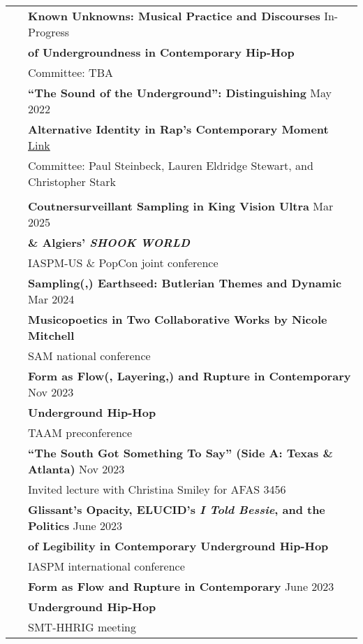 \documentclass[letterpaper, 11pt]{article}
\begin{document}
\begin{longtable}{p{1.3in}p{4.8in}}
\newpage
\nohyphens{\color{OliveGreen}{Writing Projects}} 
& \textbf{Known Unknowns: Musical Practice and Discourses} \hfill{In-Progress} \\
& \textbf{of Undergroundness in Contemporary Hip-Hop} \\
& Committee: TBA \\
& \textbf{``The Sound of the Underground'': Distinguishing} \hfill{May 2022} \\
& \textbf{Alternative Identity in Rap's Contemporary Moment} \hfill \href{https://doi.org/10.7936/cftv-at63}{Link} \\
& Committee: Paul Steinbeck, Lauren Eldridge Stewart, and Christopher Stark \\
& \\

{\color{OliveGreen}{Presentations}}
& \textbf{Coutnersurveillant Sampling in King Vision Ultra} \hfill{Mar 2025} \\
{\color{OliveGreen}{\& Lectures}} 
\ & \textbf{\& Algiers' \textit{SHOOK WORLD}} \\
& IASPM-US \& PopCon joint conference \\
& \textbf{Sampling(,) Earthseed: Butlerian Themes and Dynamic} \hfill{Mar 2024} \\
& \textbf{Musicopoetics in  Two Collaborative Works by Nicole Mitchell} \\
& SAM national conference \\
& \textbf{Form as Flow(, Layering,) and Rupture in Contemporary} \hfill{Nov 2023}  \\
& \textbf{Underground Hip-Hop}  \\
& TAAM preconference \\
& \textbf{``The South Got Something To Say'' (Side A: Texas \& Atlanta)} \hfill{Nov 2023}  \\
& Invited lecture with Christina Smiley for AFAS 3456 \\
& \textbf{Glissant's Opacity, ELUCID's \textit{I Told Bessie}, and the Politics} \hfill{June 2023} \\
& \textbf{of Legibility in Contemporary Underground Hip-Hop} \\
& IASPM international conference \\
& \textbf{Form as Flow and Rupture in Contemporary} \hfill{June 2023} \\
& \textbf{Underground Hip-Hop} \\
& SMT-HHRIG meeting\\

\end{longtable}
\end{document}
